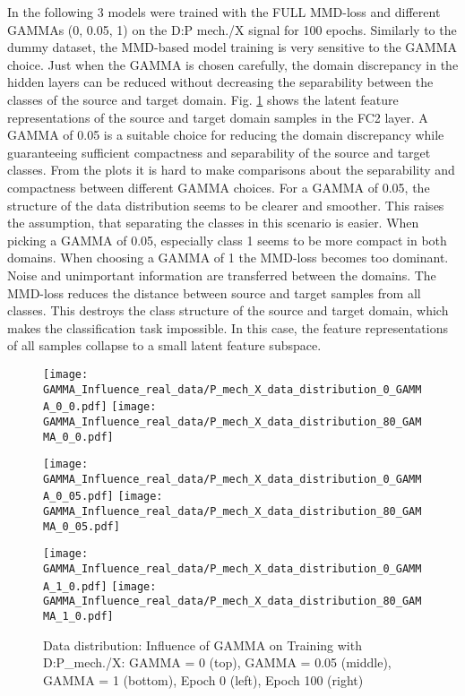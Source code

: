 In the following 3 models were trained with the FULL MMD-loss and different GAMMAs (0, 0.05, 1) on the  D:P mech./X signal for 100 epochs. Similarly to the dummy dataset, the MMD-based model training is very sensitive to the GAMMA choice. Just when the GAMMA is chosen carefully, the domain discrepancy in the hidden layers can be reduced without decreasing the separability between the classes of the source and target domain. Fig. \ref{fig:distribution_GAMMA_influence_real_data} shows the latent feature representations of the source and target domain samples in the FC2 layer. A GAMMA of 0.05 is a suitable choice for reducing the domain discrepancy while guaranteeing sufficient compactness and separability of the source and target classes. From the plots it is hard to make comparisons about the separability and compactness between different GAMMA choices. For a GAMMA of 0.05, the structure of the data distribution seems to be clearer and smoother. This raises the assumption, that separating the classes in this scenario is easier. When picking a GAMMA of 0.05, especially class 1 seems to be more compact in both domains. When choosing a GAMMA of 1 the MMD-loss becomes too dominant. Noise and unimportant information are transferred between the domains. The MMD-loss reduces the distance between source and target samples from all classes. This destroys the class structure of the source and target domain, which makes the classification task impossible. In this case, the feature representations of all samples collapse to a small latent feature subspace.

\begin{figure}[H]
  \centering
  \texttt{[image: GAMMA\_Influence\_real\_data/P\_mech\_X\_data\_distribution\_0\_GAMMA\_0\_0.pdf]}
  \hspace{.4cm}
  \texttt{[image: GAMMA\_Influence\_real\_data/P\_mech\_X\_data\_distribution\_80\_GAMMA\_0\_0.pdf]}

  \vspace{.1cm}

  \texttt{[image: GAMMA\_Influence\_real\_data/P\_mech\_X\_data\_distribution\_0\_GAMMA\_0\_05.pdf]}
  \hspace{.4cm}
  \texttt{[image: GAMMA\_Influence\_real\_data/P\_mech\_X\_data\_distribution\_80\_GAMMA\_0\_05.pdf]}

  \vspace{.1cm}

  \texttt{[image: GAMMA\_Influence\_real\_data/P\_mech\_X\_data\_distribution\_0\_GAMMA\_1\_0.pdf]}
  \hspace{.4cm}
  \texttt{[image: GAMMA\_Influence\_real\_data/P\_mech\_X\_data\_distribution\_80\_GAMMA\_1\_0.pdf]}

  \vspace{.1cm}

  \caption{Data  distribution:  Influence  of  GAMMA  on  Training with D:P\_mech./X:  GAMMA  =  0  (top), GAMMA = 0.05 (middle), GAMMA = 1 (bottom), Epoch 0 (left), Epoch 100 (right)}
  \label{fig:distribution_GAMMA_influence_real_data}
\end{figure}



